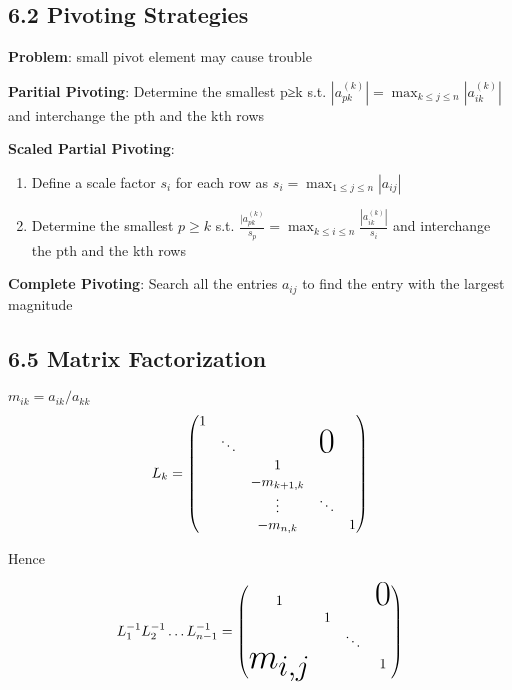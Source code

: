 \documentclass[11pt]{article}
\begin{document}
\subsection{6.2 Pivoting Strategies}
\label{sec:orgfc4490e}
\textbf{Problem}: small pivot element may cause trouble

\textbf{Paritial Pivoting}: Determine the smallest p≥k s.t.
 \(|a_{pk}^{(k)}|=\displaystyle\max_{k\le j\le n}|a_{ik}^{(k)}|\) and
 interchange the pth and the kth rows

\textbf{Scaled Partial Pivoting}:
\begin{enumerate}
\item Define a scale factor \(s_i\) for each row as \(s_i=\displaystyle\max_{1\le
       j\le n}|a_{ij}|\)
\item Determine the smallest \(p\ge k\) s.t.
\(\frac{|a_{pk}^{(k)}}{s_p}=\displaystyle\max_{k\le i\le
       n}\frac{|a_{ik}^{(k)}|}{s_i}\)
and interchange the pth and the kth rows
\end{enumerate}


\textbf{Complete Pivoting}: Search all the entries \(a_{ij}\) to find the entry with
 the largest magnitude
\subsection{6.5 Matrix Factorization}
\label{sec:org7bf2c0d}
\(m_{ik}=a_{ik}/a_{kk}\)
\begin{equation*}
L_k=
\begin{pmatrix}
1 &            &            &               &  \\
  & \ddots     &            &\mbox{\Huge 0} &  \\
  &            & 1          &               &  \\
  &            & -m_{k+1,k} &               &  \\
  &            & \vdots     & \ddots        &  \\
  &            & -m_{n,k}   &               & 1\\
\end{pmatrix}
\end{equation*}  


Hence 

\begin{equation*}
L_1^{-1}L_2^{-1}\dots L_{n-1}^{-1}=
\begin{pmatrix}
1&&&\mbox{\Huge 0}\\
&1&&\\
&&\ddots&\\
\text{\Huge $m_{i,j}$}&&&1\\
\end{pmatrix}
\end{equation*}
\end{document}
